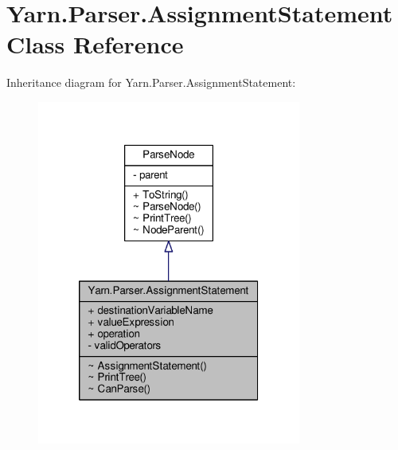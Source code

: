 \hypertarget{a00033}{\section{Yarn.\-Parser.\-Assignment\-Statement Class Reference}
\label{a00033}
}


Inheritance diagram for Yarn.\-Parser.\-Assignment\-Statement\-:
\nopagebreak
\begin{figure}[H]
\begin{center}
\leavevmode
\includegraphics[width=246pt]{a00276}
\end{center}
\end{figure}


